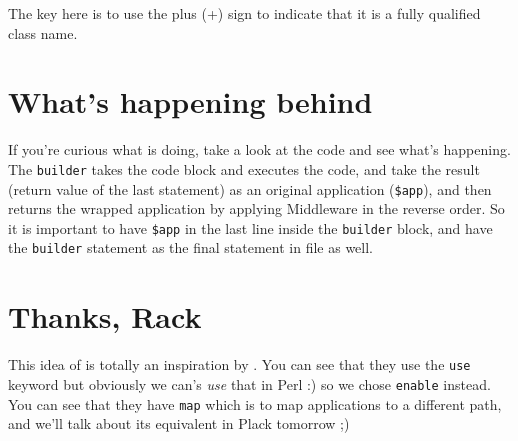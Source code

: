The key here is to use the plus (+) sign to indicate that it is a fully
qualified class name.

\section{What's happening behind}\label{whats-happening-behind}

If you're curious what  is doing, take a look at the code
and see what's happening. The \lstinline!builder! takes the code block
and executes the code, and take the result (return value of the last
statement) as an original application (\lstinline!$app!), and then
returns the wrapped application by applying Middleware in the reverse
order. So it is important to have \lstinline!$app! in the last line
inside the \lstinline!builder! block, and have the \lstinline!builder!
statement as the final statement in  file as well.

\section{Thanks, Rack}\label{thanks-rack}

This idea of  is totally an inspiration by
\href{http://m.onkey.org/2008/11/18/ruby-on-rack-2-rack-builder}{}.
You can see that they use the \lstinline!use! keyword but obviously we
can's \emph{use} that in Perl :) so we chose \lstinline!enable! instead.
You can see that they have \lstinline!map! which is to map applications
to a different path, and we'll talk about its equivalent in Plack
tomorrow ;)

